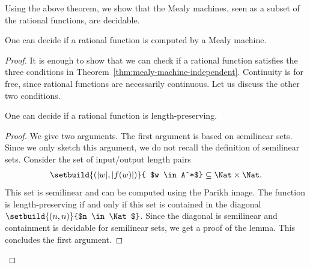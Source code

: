 Using the above theorem, we show that the Mealy machines, seen as a subset of the rational functions, are decidable. 
\begin{theorem}\label{thm:decide-if-mealy}
    One can decide if a rational function is computed by a Mealy machine.
\end{theorem}
\begin{proof}
    It is enough to show that we can check if a rational function satisfies the three conditions in Theorem~\ref{thm:mealy-machine-independent}. Continuity is for free, since rational functions are necessarily continuous. Let us discuss the other two conditions.

    \begin{lemma}\label{lem:decide-if-length-preserving}
        One can decide if a rational function is length-preserving.
    \end{lemma}
    \begin{proof} We give two arguments. The first argument is based on semilinear sets. Since we only sketch this argument, we do not recall the definition of semilinear sets. Consider the set of input/output length pairs
        \begin{align*}
        \setbuild{ (|w|,|f(w)|)}{ $w \in A^*$} \subseteq \Nat \times \Nat.
        \end{align*}
        This set is semilinear and can be computed using the Parikh image. The function is length-preserving if and only if this set is contained in the diagonal $\setbuild{(n,n)}{$n \in \Nat$}$. Since the diagonal is semilinear and containment is decidable for semilinear sets, we get a proof of the lemma. This concludes the first argument. 


\end{proof}
\end{proof}

